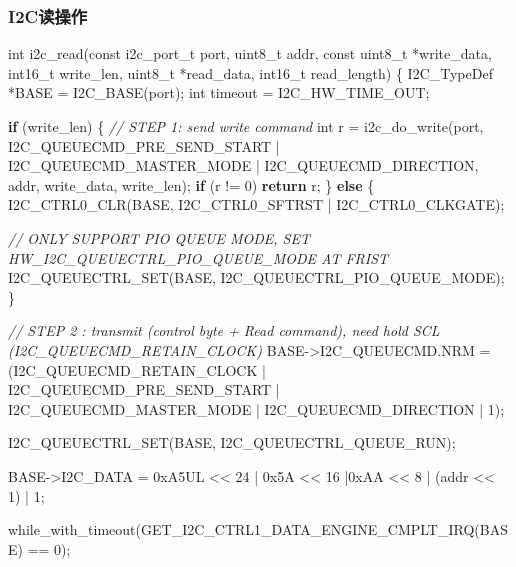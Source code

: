 \documentclass[
  12pt,
]{book}
\newenvironment{Shaded}{\begin{snugshade}}{\end{snugshade}}
\newcommand{\BaseNTok}[1]{\textcolor[rgb]{0.00,0.00,0.81}{#1}}
\newcommand{\BuiltInTok}[1]{#1}
\newcommand{\CommentTok}[1]{\textcolor[rgb]{0.56,0.35,0.01}{\textit{#1}}}
\newcommand{\ControlFlowTok}[1]{\textcolor[rgb]{0.13,0.29,0.53}{\textbf{#1}}}
\newcommand{\DataTypeTok}[1]{\textcolor[rgb]{0.13,0.29,0.53}{#1}}
\newcommand{\DecValTok}[1]{\textcolor[rgb]{0.00,0.00,0.81}{#1}}
\newcommand{\NormalTok}[1]{#1}
\begin{document}
\hypertarget{i2cux8bfbux64cdux4f5c}{%
\subsubsection{I2C读操作}\label{i2cux8bfbux64cdux4f5c}}

\begin{Shaded}
\begin{Highlighting}[]
\DataTypeTok{int}\NormalTok{ i2c_read(}\DataTypeTok{const}\NormalTok{ i2c_port_t port, }\DataTypeTok{uint8_t}\NormalTok{ addr,}
              \DataTypeTok{const} \DataTypeTok{uint8_t}\NormalTok{ *write_data, }\DataTypeTok{int16_t}\NormalTok{ write_len,}
              \DataTypeTok{uint8_t}\NormalTok{ *read_data, }\DataTypeTok{int16_t}\NormalTok{ read_length)}
\NormalTok{\{}
\NormalTok{    I2C_TypeDef *BASE = I2C_BASE(port);}
    \DataTypeTok{int}\NormalTok{ timeout = I2C_HW_TIME_OUT;}

    \ControlFlowTok{if}\NormalTok{ (write_len)}
\NormalTok{    \{}
        \CommentTok{// STEP 1: send write command}
        \DataTypeTok{int}\NormalTok{ r = i2c_do_write(port, I2C_QUEUECMD_PRE_SEND_START | I2C_QUEUECMD_MASTER_MODE | I2C_QUEUECMD_DIRECTION,}
\NormalTok{                     addr, write_data, write_len);}
        \ControlFlowTok{if}\NormalTok{ (r != }\DecValTok{0}\NormalTok{) }\ControlFlowTok{return}\NormalTok{ r;}
\NormalTok{    \}}
    \ControlFlowTok{else}
\NormalTok{    \{}
\NormalTok{        I2C_CTRL0_CLR(BASE, I2C_CTRL0_SFTRST | I2C_CTRL0_CLKGATE);}

        \CommentTok{// ONLY SUPPORT PIO QUEUE MODE, SET HW_I2C_QUEUECTRL_PIO_QUEUE_MODE AT FRIST}
\NormalTok{        I2C_QUEUECTRL_SET(BASE, I2C_QUEUECTRL_PIO_QUEUE_MODE);}
\NormalTok{    \}}

    \CommentTok{// STEP 2 : transmit (control byte + Read command), need hold SCL (I2C_QUEUECMD_RETAIN_CLOCK)}
\NormalTok{    BASE->I2C_QUEUECMD.NRM = (I2C_QUEUECMD_RETAIN_CLOCK | I2C_QUEUECMD_PRE_SEND_START | I2C_QUEUECMD_MASTER_MODE | I2C_QUEUECMD_DIRECTION |}
          \DecValTok{1}\NormalTok{);}

\NormalTok{    I2C_QUEUECTRL_SET(BASE, I2C_QUEUECTRL_QUEUE_RUN);}

\NormalTok{    BASE->I2C_DATA = }\BaseNTok{0xA5}\BuiltInTok{UL}\NormalTok{ << }\DecValTok{24}\NormalTok{ | }\BaseNTok{0x5A}\NormalTok{   << }\DecValTok{16}\NormalTok{ |}\BaseNTok{0xAA}\NormalTok{   <<  }\DecValTok{8}\NormalTok{ | (addr <<  }\DecValTok{1}\NormalTok{) | }\DecValTok{1}\NormalTok{;}

\NormalTok{    while_with_timeout(GET_I2C_CTRL1_DATA_ENGINE_CMPLT_IRQ(BASE) == }\DecValTok{0}\NormalTok{);}


\end{Highlighting}
\end{Shaded}
\end{document}
